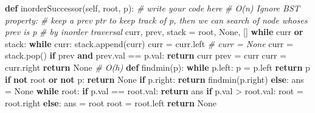 \documentclass[
]{article}
\newenvironment{Shaded}{}{}
\newcommand{\CommentTok}[1]{\textcolor[rgb]{0.38,0.63,0.69}{\textit{#1}}}
\newcommand{\ControlFlowTok}[1]{\textcolor[rgb]{0.00,0.44,0.13}{\textbf{#1}}}
\newcommand{\KeywordTok}[1]{\textcolor[rgb]{0.00,0.44,0.13}{\textbf{#1}}}
\newcommand{\NormalTok}[1]{#1}
\newcommand{\OperatorTok}[1]{\textcolor[rgb]{0.40,0.40,0.40}{#1}}
\newcommand{\VariableTok}[1]{\textcolor[rgb]{0.10,0.09,0.49}{#1}}
\begin{document}
\begin{Shaded}
\begin{Highlighting}[]
\KeywordTok{def}\NormalTok{ inorderSuccessor(}\VariableTok{self}\NormalTok{, root, p):}
        \CommentTok{\# write your code here}
        \CommentTok{\# O(n) Ignore BST property:}
        \CommentTok{\# keep a prev ptr to keep track of p, then we can search of node whose\textquotesingle{}s prev is p}
        \CommentTok{\# by inorder traversal}
\NormalTok{        curr, prev, stack }\OperatorTok{=}\NormalTok{ root, }\VariableTok{None}\NormalTok{, []}
        \ControlFlowTok{while}\NormalTok{ curr }\KeywordTok{or}\NormalTok{ stack:}
            \ControlFlowTok{while}\NormalTok{ curr:}
\NormalTok{                stack.append(curr)}
\NormalTok{                curr }\OperatorTok{=}\NormalTok{ curr.left }
            \CommentTok{\# curr = None}
\NormalTok{            curr }\OperatorTok{=}\NormalTok{ stack.pop()}
            \ControlFlowTok{if}\NormalTok{ prev }\KeywordTok{and}\NormalTok{ prev.val }\OperatorTok{==}\NormalTok{ p.val:}
                \ControlFlowTok{return}\NormalTok{ curr}
\NormalTok{            prev }\OperatorTok{=}\NormalTok{ curr}
\NormalTok{            curr }\OperatorTok{=}\NormalTok{ curr.right}
        \ControlFlowTok{return} \VariableTok{None}
        \CommentTok{\# O(h) }
        \KeywordTok{def}\NormalTok{ findmin(p):}
            \ControlFlowTok{while}\NormalTok{ p.left:}
\NormalTok{                p }\OperatorTok{=}\NormalTok{ p.left}
            \ControlFlowTok{return}\NormalTok{ p}
        \ControlFlowTok{if} \KeywordTok{not}\NormalTok{ root }\KeywordTok{or} \KeywordTok{not}\NormalTok{ p: }\ControlFlowTok{return} \VariableTok{None}
        \ControlFlowTok{if}\NormalTok{ p.right:}
            \ControlFlowTok{return}\NormalTok{ findmin(p.right)}
        \ControlFlowTok{else}\NormalTok{:}
\NormalTok{            ans }\OperatorTok{=} \VariableTok{None}
            \ControlFlowTok{while}\NormalTok{ root:}
                \ControlFlowTok{if}\NormalTok{ p.val }\OperatorTok{==}\NormalTok{ root.val:}
                    \ControlFlowTok{return}\NormalTok{ ans}
                \ControlFlowTok{if}\NormalTok{ p.val }\OperatorTok{\textgreater{}}\NormalTok{ root.val:}
\NormalTok{                    root }\OperatorTok{=}\NormalTok{ root.right}
                \ControlFlowTok{else}\NormalTok{:}
\NormalTok{                    ans }\OperatorTok{=}\NormalTok{ root}
\NormalTok{                    root }\OperatorTok{=}\NormalTok{ root.left}
            \ControlFlowTok{return} \VariableTok{None}
\end{Highlighting}
\end{Shaded}
\end{document}
